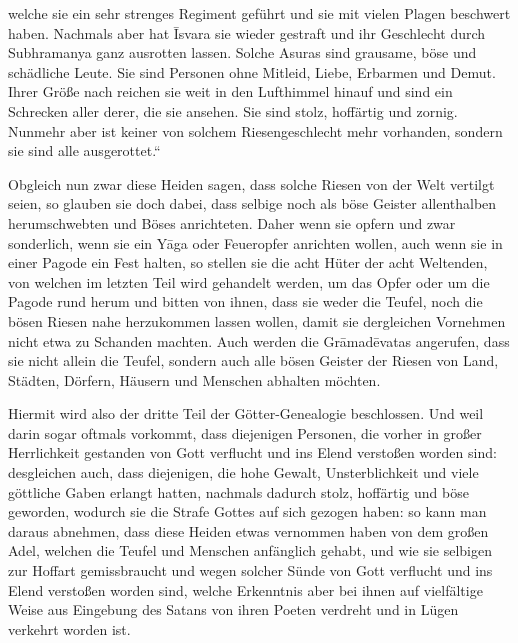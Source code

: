 \documentclass{article}
\begin{document}
welche sie ein sehr strenges Regiment geführt und sie mit vielen Plagen beschwert haben. Nachmals aber hat \={I}svara sie wieder gestraft und ihr Geschlecht durch Subhramanya ganz ausrotten lassen. Solche Asuras sind grausame, böse und schädliche Leute. Sie sind Personen ohne Mitleid, Liebe, Erbarmen und Demut. Ihrer Größe nach reichen sie weit in den Lufthimmel hinauf und sind ein Schrecken aller derer, die sie ansehen. Sie sind stolz, hoffärtig und zornig. Nunmehr aber ist keiner von solchem Riesengeschlecht mehr vorhanden, sondern sie sind alle ausgerottet.“

Obgleich nun zwar diese Heiden sagen, dass solche Riesen von der Welt vertilgt seien, so glauben sie doch dabei, dass selbige noch als böse Geister allenthalben herumschwebten und Böses anrichteten. Daher wenn sie opfern und zwar sonderlich, wenn sie ein Y\={a}ga oder Feueropfer anrichten wollen, auch wenn sie in einer Pagode ein Fest halten, so stellen sie die acht Hüter der acht Weltenden, von welchen im letzten Teil wird gehandelt werden, um das Opfer oder um die Pagode rund herum und bitten von ihnen, dass sie weder die Teufel, noch die bösen Riesen nahe herzukommen lassen wollen, damit sie dergleichen Vornehmen nicht etwa zu Schanden machten. Auch werden die Gr\={a}mad\={e}vatas angerufen, dass sie nicht allein die Teufel, sondern auch alle bösen Geister der Riesen von Land, Städten, Dörfern, Häusern und Menschen abhalten möchten.

Hiermit wird also der dritte Teil der Götter-Genealogie beschlossen. Und weil darin sogar oftmals vorkommt, dass diejenigen Personen, die vorher in großer Herrlichkeit gestanden von Gott verflucht und ins Elend verstoßen worden sind: desgleichen auch, dass diejenigen, die hohe Gewalt, Unsterblichkeit und viele göttliche Gaben erlangt hatten, nachmals dadurch stolz, hoffärtig und böse geworden, wodurch sie die Strafe Gottes auf sich gezogen haben: so kann man daraus abnehmen, dass diese Heiden etwas vernommen haben von dem großen Adel, welchen die Teufel und Menschen anfänglich gehabt, und wie sie selbigen zur Hoffart gemissbraucht und wegen solcher Sünde von Gott verflucht und ins Elend verstoßen worden sind, welche Erkenntnis aber bei ihnen auf vielfältige Weise aus Eingebung des Satans von ihren Poeten verdreht und in Lügen verkehrt worden ist.

\begin{center}
\end{center}
\end{document}
